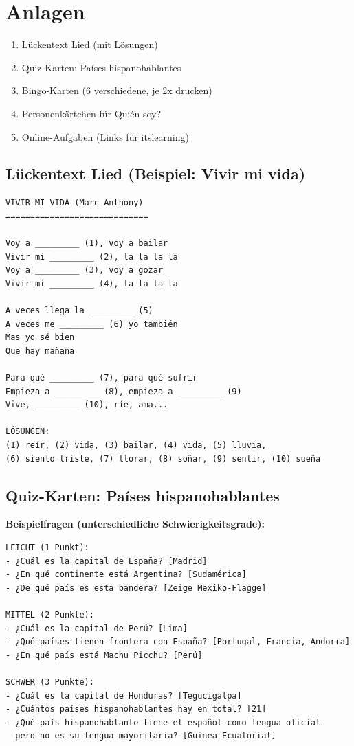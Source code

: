 \documentclass[11pt,a4paper]{article}
\begin{document}
\section{Anlagen}

\begin{enumerate}
    \item Lückentext Lied (mit Lösungen)
    \item Quiz-Karten: Países hispanohablantes
    \item Bingo-Karten (6 verschiedene, je 2x drucken)
    \item Personenkärtchen für \glqq{}\textquestiondown{}Quién soy?\grqq{}
    \item Online-Aufgaben (Links für itslearning)
\end{enumerate}

\subsection{Lückentext Lied (Beispiel: \glqq{}Vivir mi vida\grqq{})}

\begin{verbatim}
VIVIR MI VIDA (Marc Anthony)
=============================

Voy a _________ (1), voy a bailar
Vivir mi _________ (2), la la la la
Voy a _________ (3), voy a gozar
Vivir mi _________ (4), la la la la

A veces llega la _________ (5)
A veces me _________ (6) yo también
Mas yo sé bien
Que hay mañana

Para qué _________ (7), para qué sufrir
Empieza a _________ (8), empieza a _________ (9)
Vive, _________ (10), ríe, ama...

LÖSUNGEN:
(1) reír, (2) vida, (3) bailar, (4) vida, (5) lluvia,
(6) siento triste, (7) llorar, (8) soñar, (9) sentir, (10) sueña
\end{verbatim}

\subsection{Quiz-Karten: Países hispanohablantes}

\textbf{Beispielfragen (unterschiedliche Schwierigkeitsgrade):}

\begin{verbatim}
LEICHT (1 Punkt):
- ¿Cuál es la capital de España? [Madrid]
- ¿En qué continente está Argentina? [Sudamérica]
- ¿De qué país es esta bandera? [Zeige Mexiko-Flagge]

MITTEL (2 Punkte):
- ¿Cuál es la capital de Perú? [Lima]
- ¿Qué países tienen frontera con España? [Portugal, Francia, Andorra]
- ¿En qué país está Machu Picchu? [Perú]

SCHWER (3 Punkte):
- ¿Cuál es la capital de Honduras? [Tegucigalpa]
- ¿Cuántos países hispanohablantes hay en total? [21]
- ¿Qué país hispanohablante tiene el español como lengua oficial
  pero no es su lengua mayoritaria? [Guinea Ecuatorial]
\end{verbatim}
\end{document}
